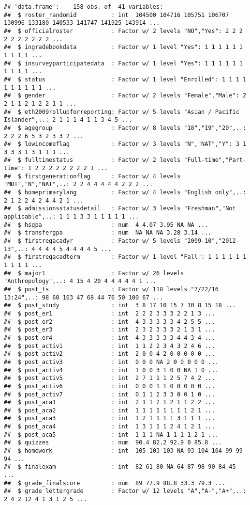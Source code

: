 \documentclass[
]{book}
\begin{document}
\begin{verbatim}
## 'data.frame':    158 obs. of  41 variables:
##  $ roster_randomid          : int  104500 104716 105751 106707 130996 133180 140533 141747 141925 143914 ...
##  $ officialroster           : Factor w/ 2 levels "NO","Yes": 2 2 2 2 2 2 2 2 2 2 ...
##  $ ingradebookdata          : Factor w/ 1 level "Yes": 1 1 1 1 1 1 1 1 1 1 ...
##  $ insurveyparticipatedata  : Factor w/ 1 level "Yes": 1 1 1 1 1 1 1 1 1 1 ...
##  $ status                   : Factor w/ 1 level "Enrolled": 1 1 1 1 1 1 1 1 1 1 ...
##  $ gender                   : Factor w/ 2 levels "Female","Male": 2 2 1 1 2 1 2 2 1 1 ...
##  $ eth2009rollupforreporting: Factor w/ 5 levels "Asian / Pacific Islander",..: 2 1 1 1 4 1 1 3 4 5 ...
##  $ agegroup                 : Factor w/ 8 levels "18","19","20",..: 2 2 2 6 5 3 2 3 3 2 ...
##  $ lowincomeflag            : Factor w/ 3 levels "N","NAT","Y": 3 1 3 3 3 1 3 1 1 1 ...
##  $ fulltimestatus           : Factor w/ 2 levels "Full-time","Part-time": 1 2 2 2 2 2 2 2 2 1 ...
##  $ firstgenerationflag      : Factor w/ 4 levels "MDT","N","NAT",..: 2 2 4 4 4 4 4 2 2 2 ...
##  $ homeprimarylang          : Factor w/ 4 levels "English only",..: 2 1 2 2 4 2 4 4 2 1 ...
##  $ admissionsstatusdetail   : Factor w/ 3 levels "Freshman","Not applicable",..: 1 1 1 3 3 1 1 1 1 1 ...
##  $ hsgpa                    : num  4 4.07 3.95 NA NA ...
##  $ transfergpa              : num  NA NA NA 3.28 3.14 ...
##  $ firstregacadyr           : Factor w/ 5 levels "2009-10","2012-13",..: 4 4 4 4 5 4 4 4 4 5 ...
##  $ firstregacadterm         : Factor w/ 1 level "Fall": 1 1 1 1 1 1 1 1 1 1 ...
##  $ major1                   : Factor w/ 26 levels "Anthropology",..: 4 15 4 20 4 4 4 4 4 1 ...
##  $ post_ts                  : Factor w/ 118 levels "7/22/16 13:24",..: 98 60 103 47 68 44 76 50 100 67 ...
##  $ post_study               : int  3 8 17 10 15 7 10 8 15 18 ...
##  $ post_er1                 : int  2 2 2 3 3 3 2 2 1 3 ...
##  $ post_er2                 : int  4 3 3 3 3 3 4 2 5 5 ...
##  $ post_er3                 : int  2 3 2 3 3 3 2 1 3 1 ...
##  $ post_er4                 : int  4 3 3 3 3 3 4 4 3 4 ...
##  $ post_activ1              : int  1 1 2 2 3 4 3 2 4 6 ...
##  $ post_activ2              : int  2 0 0 4 2 0 0 0 0 0 ...
##  $ post_activ3              : int  0 0 0 NA 2 0 0 0 0 0 ...
##  $ post_activ4              : int  1 0 0 3 1 0 0 NA 1 0 ...
##  $ post_activ5              : int  2 7 1 1 1 2 5 7 4 2 ...
##  $ post_activ6              : int  0 0 0 1 1 0 0 0 0 0 ...
##  $ post_activ7              : int  0 1 1 2 3 3 0 0 1 0 ...
##  $ post_aca1                : int  2 1 1 2 1 2 1 1 2 2 ...
##  $ post_aca2                : int  1 1 1 1 1 1 1 1 2 1 ...
##  $ post_aca3                : int  1 2 1 1 1 1 3 1 1 1 ...
##  $ post_aca4                : int  1 3 1 1 1 2 4 1 2 1 ...
##  $ post_aca5                : int  1 1 1 NA 1 1 1 1 2 1 ...
##  $ quizzes                  : num  90.4 82.2 92.9 0 85.8 ...
##  $ homework                 : int  105 103 103 NA 93 104 104 99 99 94 ...
##  $ finalexam                : int  82 61 80 NA 64 87 98 90 84 45 ...
##  $ grade_finalscore         : num  89 77.9 88.8 33.3 79.3 ...
##  $ grade_lettergrade        : Factor w/ 12 levels "A","A-","A+",..: 2 4 2 12 4 1 3 1 2 5 ...
\end{verbatim}
\end{document}
